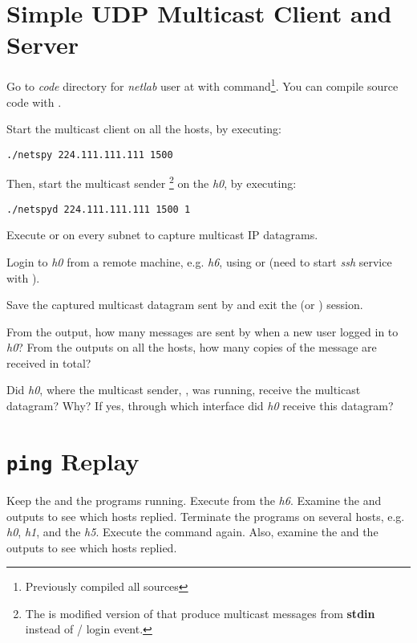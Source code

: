 \documentclass{../UTNetLab}
\begin{document}
\section{Simple UDP Multicast Client and Server}
Go to \textit{code} directory for \textit{netlab} user at  with  command\footnote{Previously compiled all sources}.
You can compile source code with .

Start the multicast client  on all the hosts, by executing:
\begin{lstlisting}
./netspy 224.111.111.111 1500
    \end{lstlisting}
Then, start the multicast sender \footnote{The  is modified version of  that produce multicast messages from \textbf{stdin} instead of / login event.} on the \textit{h0}, by executing:
\begin{lstlisting}
./netspyd 224.111.111.111 1500 1
    \end{lstlisting}
Execute  or  on every subnet to capture multicast IP datagrams.

Login to \textit{h0} from a remote machine, e.g. \textit{h6}, using  or  (need to start \textit{ssh} service with ).

Save the captured multicast datagram sent by  and exit the  (or ) session.

\begin{report}
    \item From the  output, how many messages are sent by  when a new user logged in to \textit{h0}?
    From the  outputs on all the hosts, how many copies of the message are received in total?

    \item Did \textit{h0}, where the multicast sender, , was running, receive the multicast datagram?
    Why?
    If yes, through which interface did \textit{h0} receive this datagram?
\end{report}

\section{\texttt{ping} Replay}
Keep the  and the  programs running.
Execute  from the \textit{h6}.
Examine the  and  outputs to see which hosts replied.
Terminate the  programs on several hosts, e.g. \textit{h0}, \textit{h1}, and the \textit{h5}.
Execute the  command again.
Also, examine the  and the  outputs to see which hosts replied.
\end{document}
